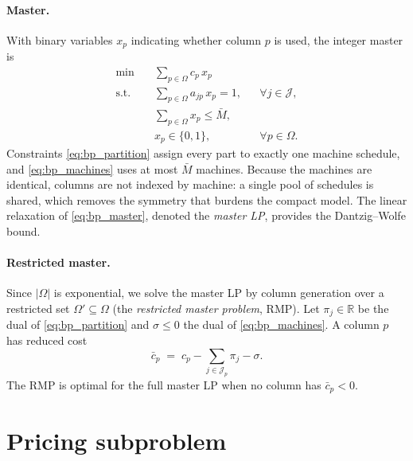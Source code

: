 \documentclass[review,3p,times,authoryear]{elsarticle}
\newcommand{\J}{\mathcal{J}}
\newcommand{\Om}{\Omega}
\newcommand{\Mbar}{\bar{M}}
\begin{document}
\paragraph{Master.} With binary variables $x_p$ indicating whether column $p$ is
used, the integer master is
\begin{subequations}\label{eq:bp_master}
\begin{align}
\min\quad & \sum_{p\in\Om} c_p\,x_p \label{eq:bp_obj}\\
\text{s.t.}\quad
& \sum_{p\in\Om} a_{jp}\,x_p = 1, && \forall j\in\J, \label{eq:bp_partition}\\
& \sum_{p\in\Om} x_p \le \Mbar, && \label{eq:bp_machines}\\
& x_p\in\{0,1\}, && \forall p\in\Om. \label{eq:bp_binary}
\end{align}
\end{subequations}
Constraints \eqref{eq:bp_partition} assign every part to exactly one machine
schedule, and \eqref{eq:bp_machines} uses at most $\Mbar$ machines. Because the
machines are identical, columns are not indexed by machine: a single pool of
schedules is shared, which removes the symmetry that burdens the compact model.
The linear relaxation of \eqref{eq:bp_master}, denoted the \emph{master LP},
provides the Dantzig--Wolfe bound.

\paragraph{Restricted master.} Since $|\Om|$ is exponential, we solve the master
LP by column generation over a restricted set $\Om'\subseteq\Om$ (the
\emph{restricted master problem}, RMP). Let $\pi_j\in\mathbb{R}$ be the dual of
\eqref{eq:bp_partition} and $\sigma\le 0$ the dual of \eqref{eq:bp_machines}. A
column $p$ has reduced cost
\begin{equation}
\bar c_p \;=\; c_p-\sum_{j\in\J_p}\pi_j-\sigma .
\label{eq:bp_redcost}
\end{equation}
The RMP is optimal for the full master LP when no column has $\bar c_p<0$.

\section{Pricing subproblem}
\label{sec:bp_pricing}
\end{document}

